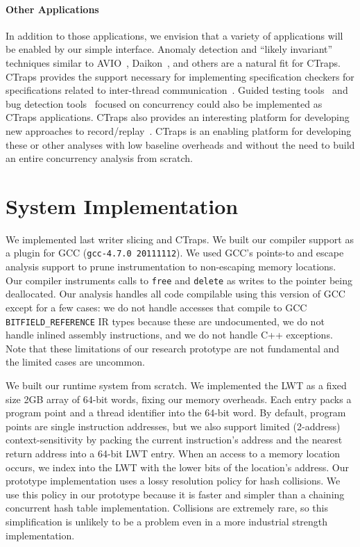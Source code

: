 \documentclass[preprint,9pt]{sigplanconf}
\newcommand{\ctraps}{CTraps\xspace}
\begin{document}
\paragraph{Other Applications}
In addition to those applications, we envision that a variety of applications
will be enabled by our simple interface.  Anomaly detection and ``likely
invariant'' techniques similar to AVIO~\cite{avio}, Daikon~\cite{daikon}, and
others are a natural fit for \ctraps.  \ctraps provides the support necessary
for implementing specification checkers for specifications related to
inter-thread communication~\cite{velodrome,oshajava}.  Guided testing
tools~\cite{cuzz,chess} and bug detection tools~\cite{ctrigger} focused on
concurrency could also be implemented as \ctraps applications.  \ctraps also
provides an interesting platform for developing new approaches to
record/replay~\cite{chimera,fdr}.  \ctraps is an enabling platform for
developing these or other analyses with low baseline overheads and without the
need to build an entire concurrency analysis from scratch.

\section{System Implementation}

We implemented last writer slicing and \ctraps.  We built our compiler support
as a plugin for GCC ({\tt gcc-4.7.0 20111112}).  We used GCC's points-to and
escape analysis support to prune instrumentation to non-escaping memory
locations.  Our compiler instruments calls to {\tt free} and {\tt delete} as
writes to the pointer being deallocated.  Our analysis handles all code
compilable using this version of GCC except for a few cases: we do not handle
accesses that compile to GCC {\tt BITFIELD\_REFERENCE} IR types because these
are undocumented, we do not handle inlined assembly instructions, and we do not
handle C++ exceptions.  Note that these limitations of our research prototype
are not fundamental and the limited cases are uncommon.   

We built our runtime system from scratch.  We implemented the LWT as a fixed
size 2GB array of 64-bit words, fixing our memory overheads.  Each entry packs a program point and a thread
identifier into the 64-bit word.  By default, program points are single
instruction addresses, but we also support limited (2-address)
context-sensitivity by packing the current instruction's address and the
nearest return address into a 64-bit LWT entry. When an access to a memory
location occurs, we index into the LWT with the lower bits of the location's
address.  Our prototype implementation uses a lossy resolution policy for hash
collisions.  We use this policy in our prototype because it is faster and
simpler than a chaining concurrent hash table implementation.  Collisions are
extremely rare, so this simplification is unlikely to be a problem even in a
more industrial strength implementation.  
\end{document}
